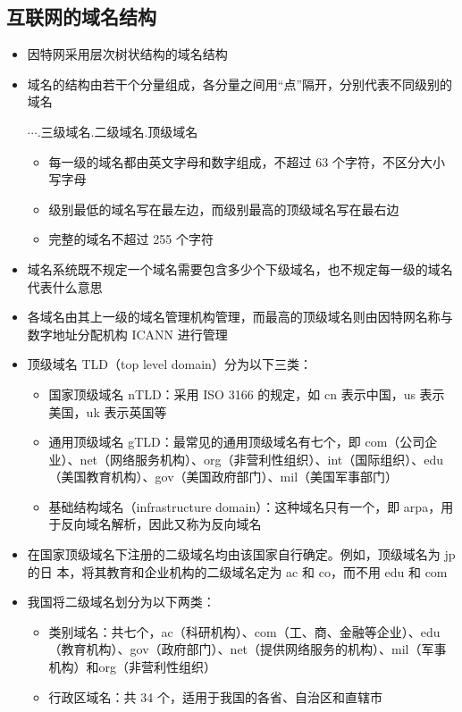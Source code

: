 \documentclass[cs4size,a4paper,10pt]{ctexart}
\begin{document}
	\subsection{互联网的域名结构}
	\begin{itemize}
		\item 因特网采用层次树状结构的域名结构
		\item 域名的结构由若干个分量组成，各分量之间用“点”隔开，分别代表不同级别的域名
		\begin{center}
			$\cdots$.三级域名.二级域名.顶级域名
		\end{center}
		\begin{itemize}
			\item 每一级的域名都由英文字母和数字组成，不超过 63 个字符，不区分大小写字母
			\item 级别最低的域名写在最左边，而级别最高的顶级域名写在最右边
			\item 完整的域名不超过 255 个字符
		\end{itemize}
		\item 域名系统既不规定一个域名需要包含多少个下级域名，也不规定每一级的域名代表什么意思
		\item 各域名由其上一级的域名管理机构管理，而最高的顶级域名则由因特网名称与数字地址分配机构 ICANN 进行管理
		\item 顶级域名 TLD（top level domain）分为以下三类：
		\begin{itemize}
			\item 国家顶级域名 nTLD：采用 ISO 3166 的规定，如 cn 表示中国，us 表示美国，uk 表示英国等
			\item 通用顶级域名 gTLD：最常见的通用顶级域名有七个，即 com（公司企业）、net（网络服务机构）、org（非营利性组织）、int（国际组织）、edu（美国教育机构）、gov（美国政府部门）、mil（美国军事部门）
			\item 基础结构域名（infrastructure domain）：这种域名只有一个，即 arpa，用于反向域名解析，因此又称为反向域名
		\end{itemize}
		\item 在国家顶级域名下注册的二级域名均由该国家自行确定。例如，顶级域名为 jp 的日 本，将其教育和企业机构的二级域名定为 ac 和 co，而不用 edu 和 com
		\item 我国将二级域名划分为以下两类：
		\begin{itemize}
			\item 类别域名：共七个，ac（科研机构）、com（工、商、金融等企业）、edu（教育机构）、gov（政府部门）、net（提供网络服务的机构）、mil（军事机构）和org（非营利性组织）
			\item 行政区域名：共 34 个，适用于我国的各省、自治区和直辖市
		\end{itemize}
	\end{itemize}
\end{document}
